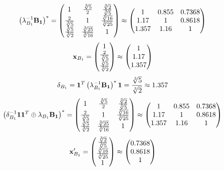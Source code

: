 \documentclass[10pt,a4paper]{article}
\begin{document}
	\[
		\left(\lambda_{B_1}^{-1}\bold{B_1}\right)^* = 
		\begin{pmatrix}
			{1} {} & \frac{\sqrt[3]{5}} {{2}} & \frac{\sqrt[3]{2}} {\sqrt[3]{5}} \\
			\frac{{2}} {\sqrt[3]{5}} & {1} {} & \frac{\sqrt[3]{16}} {\sqrt[3]{25}} \\
			\frac{\sqrt[3]{5}} {\sqrt[3]{2}} & \frac{\sqrt[3]{25}} {\sqrt[3]{16}} & {1} {} \\
		\end{pmatrix}
		\approx
		\begin{pmatrix}
			1        & 0.855    & 0.7368   \\
			1.17     & 1        & 0.8618   \\
			1.357    & 1.16     & 1        \\
		\end{pmatrix}
	\]
	\[
		\bold{x}_{B_1} = 
		\begin{pmatrix}
			{1} {} \\
			\frac{{2}} {\sqrt[3]{5}} \\
			\frac{\sqrt[3]{5}} {\sqrt[3]{2}} \\
		\end{pmatrix}
		\approx
		\begin{pmatrix}
			1        \\
			1.17     \\
			1.357    \\
		\end{pmatrix}
	\]
	\[
		\delta_{B_1} = \bold{1}^T \left(\lambda_{B_1}^{-1}\bold{B_1}\right)^* \bold{1} = \frac{\sqrt[3]{5}} {\sqrt[3]{2}}\approx 1.357
	\]
	\[
		\left(\delta_{B_1}^{-1}\bold{11}^T \oplus \lambda_{B_1}\bold{B_1}\right)^* = 
		\begin{pmatrix}
			{1} {} & \frac{\sqrt[3]{5}} {{2}} & \frac{\sqrt[3]{2}} {\sqrt[3]{5}} \\
			\frac{{2}} {\sqrt[3]{5}} & {1} {} & \frac{\sqrt[3]{16}} {\sqrt[3]{25}} \\
			\frac{\sqrt[3]{5}} {\sqrt[3]{2}} & \frac{\sqrt[3]{25}} {\sqrt[3]{16}} & {1} {} \\
		\end{pmatrix}
		\approx
		\begin{pmatrix}
			1        & 0.855    & 0.7368   \\
			1.17     & 1        & 0.8618   \\
			1.357    & 1.16     & 1        \\
		\end{pmatrix}
	\]
	\[
		\bold{x}'_{B_1} = 
		\begin{pmatrix}
			\frac{\sqrt[3]{2}} {\sqrt[3]{5}} \\
			\frac{\sqrt[3]{16}} {\sqrt[3]{25}} \\
			{1} {} \\
		\end{pmatrix}
		\approx
		\begin{pmatrix}
			0.7368   \\
			0.8618   \\
			1        \\
		\end{pmatrix}
	\]
\end{document}
